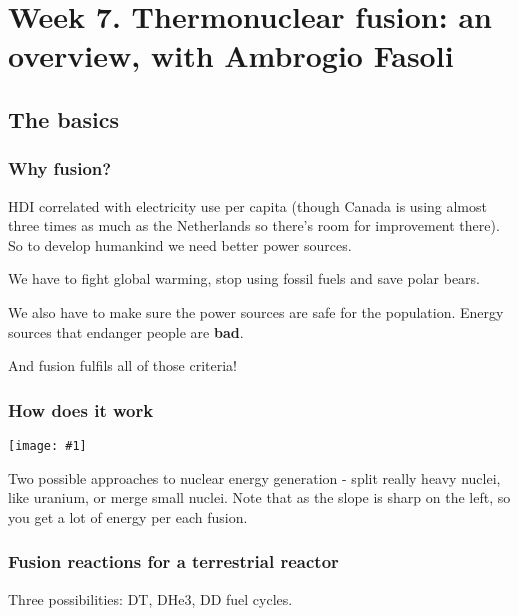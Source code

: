 \documentclass[PlasmaNotes.tex]{subfiles}
\begin{document}
\setcounter{section}{6}
\let\oldexp\exp
\renewcommand{\exp}[1]{\oldexp(#1)}
\newcommand{\png}[1]{\begin{center}\texttt{[image: \#1]}\end{center}}
\newcommand{\largepng}[1]{\begin{center}\texttt{[image: \#1]}\end{center}}
\newcommand{\goesto}{\rightarrow}
\section{Week 7. Thermonuclear fusion: an overview, with Ambrogio Fasoli}

\subsection{The basics}

\subsubsection{Why fusion?}

HDI correlated with electricity use per capita (though Canada is using almost three times as much as the Netherlands so there's room for improvement there). So to develop humankind we need better power sources.

We have to fight global warming, stop using fossil fuels and save polar bears.

We also have to make sure the power sources are safe for the population. Energy sources that endanger people are \textbf{bad}.

And fusion fulfils all of those criteria!

\subsubsection{How does it work}

\png{bindingenergycurve.PNG}

Two possible approaches to nuclear energy generation - split really heavy nuclei, like uranium, or merge small nuclei. Note that as the slope is sharp on the left, so you get a lot of energy per each fusion.

\subsubsection{Fusion reactions for a terrestrial reactor}

Three possibilities: DT, DHe3, DD fuel cycles.
\end{document}

